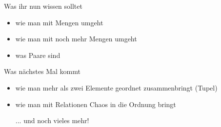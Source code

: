 

\begin{frame}
	\begin{block}{Was ihr nun wissen solltet}
		\begin{itemize}
			\item wie man mit Mengen umgeht
			\item wie man mit noch mehr Mengen umgeht
			\item was Paare sind
		\end{itemize}
	\end{block}

	\begin{block}{Was nächstes Mal kommt}
		\begin{itemize}
			\item wie man mehr als zwei Elemente geordnet zusammenbringt (Tupel)
			\item wie man mit Relationen Chaos in die Ordnung bringt
			\item[ ...] und noch vieles mehr!
		\end{itemize}
	\end{block}
\end{frame}





